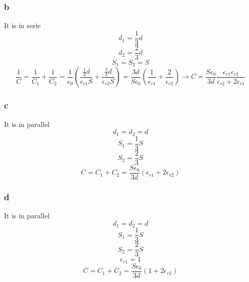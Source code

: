 \subsubsection{b}
It is in serie
\[
	d_1 = \frac{1}{3} d
\]
\[
	d_2 = \frac{2}{3} d
\]
\[
	S_1 = S_2 = S
\]
\[
	\frac{1}{C} = \frac{1}{C_1} + \frac{1}{C_2}
	= \frac{1}{\epsilon_0}
	( \frac{\frac{1}{3} d}{\epsilon_{r1} S} +
	\frac{\frac{2}{3} d}{\epsilon_{r2} S} )
	= \frac{3d}{S \epsilon_0}
	( \frac{1}{\epsilon_{r1}} +
	\frac{2}{\epsilon_{r2}} )
	\to C = \frac{S \epsilon_0}{3 d}
	\frac{\epsilon_{r1} \epsilon_{r2}}{\epsilon_{r2} + 2 \epsilon_{r1}}
\]

\subsubsection{c}
It is in parallel
\[
	d_1 = d_2 = d
\]
\[
	S_1 = \frac{1}{3} S
\]
\[
	S_2 = \frac{2}{3} S
\]
\[
	C = C_1 + C_2 = \frac{S \epsilon_0}{3 d}
	( \epsilon_{r1} + 2 \epsilon_{r2} )
\]

\subsubsection{d}
It is in parallel
\[
	d_1 = d_2 = d
\]
\[
	S_1 = \frac{1}{3} S
\]
\[
	S_2 = \frac{2}{3} S
\]
\[
	\epsilon_{r1} = 1
\]
\[
	C = C_1 + C_2 = \frac{S \epsilon_0}{3 d}
	( 1 + 2 \epsilon_{r2} )
\]
